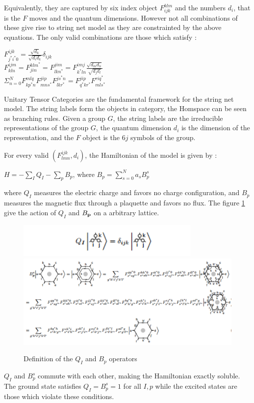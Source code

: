 Equivalently, they are captured by six index object $F_{ijk}^{klm}$ and the numbers $d_{i}$, that is the $F$ moves and the quantum dimensions. However not
all combinations of these give rise to string net model as they are constrainted by the above equations. The only valid combinations are those
which satisfy :
\begin{center}
$F^{ijk}_{j^{*}i^{*}0} = \frac{\sqrt{d_{k}}}{\sqrt{d_{i}d_{k}}}\delta_{ijk}$ \\
$F^{ijm}_{kln} = F^{klm^{*}}_{jin} = F^{jim}_{lkn^{*}} = F^{imj}_{k^{*}ln}\frac{\sqrt{d_{m}d_{n}}}{\sqrt{d_{j}d_{l}}}$ \\
$\varSigma_{n=0}^{N}F^{mlq}_{kp^{*}n}F^{jip}_{mns^{*}}F^{js^{*}n}_{lkr^{*}} = F^{jip}_{q^{*}kr^{*}}F^{riq^{*}}_{mls^{*}}$ 
\end{center}

Unitary Tensor Categories are the fundamental framework for the string net model. The string labels form the objects in category,
the Homspace can be seen as branching rules. Given a group $G$, the string labels are the irreducible representations of the group
$G$, the quantum dimension $d_{i}$ is the dimension of the representation, and the $F$ object is the $6j$ symbols of the group.

For every valid  $(F^{ijk}_{lmn}, d_{i})$,  the Hamiltonian of the model is given by :
\begin{center}
 $H = -\sum_{I}Q_{I} - \sum_{p}B_{p}$, where  $B_{p} = \sum_{s=0}^{N}a_{s}B_{p}^{s}$
\end{center}
where $Q_{I}$ measures the electric charge and favors no charge configuration, and $B_{p}$ measures the magnetic flux through a plaquette
and favors no flux. The figure \ref{fig:QvBp_Levin_Wen} give the action of $Q_{I}$ and $B_{\bold{p}}$ on a arbitrary lattice.
\begin{figure}
\centering
\includegraphics[width=9cm]{Q_I_LW.pdf}\\
\includegraphics[width=15cm]{B_p_LW.pdf}
\caption[Vertex and Face operators in Levin-Wen model]{Definition of the $Q_{I}$ and $B_{p}$ operators}
\centering
\label{fig:QvBp_Levin_Wen}
\end{figure}
$Q_{I}$ and $B_{p}^{s}$ commute with each other, making the Hamiltonian exactly soluble. The ground state satisfies $Q_{I} = B_{p}^{s} = 1$ for
all $I, p$ while the excited states are those which violate these conditions. 

